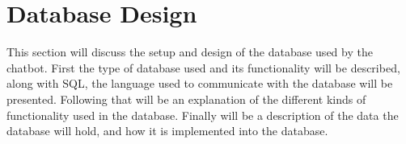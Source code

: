 \section{Database Design}
\label{section:database_design}

This section will discuss the setup and design of the database used by the chatbot. First the type of database used and its functionality will be described, along with SQL, the language used to communicate with the database will be presented. Following that will be an explanation of the different kinds of functionality used in the database. Finally will be a description of the data the database will hold, and how it is implemented into the database. 